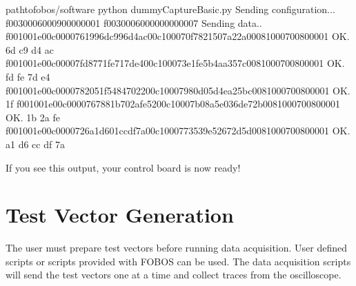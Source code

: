 \documentclass[letterpaper,10pt,english]{sphinxmanual}
\begin{document}
\begin{sphinxVerbatim}[commandchars=\\\{\}]
\PYGZdl{}  path\PYGZhy{}to\PYGZhy{}fobos/software
\PYGZdl{} python dummyCaptureBasic.py
Sending configuration...
f0030006000900000001
 
f0030006000000000007
 
Sending data..
f001001e00c0000761996dc996d4ac00c100070f7821507a22a00081000700800001
OK.     
  6d c9  d4 ac
f001001e00c00007fd8771fe717de400c100073e1fe5b4aa357c0081000700800001
OK.     
fd   fe  7d e4
f001001e00c0000782051f5484702200c10007980d05d4ea25bc0081000700800001
OK.     
  1f    
f001001e00c0000767881b702afe5200c10007b08a5e036de72b0081000700800001
OK.     
  1b  2a fe 
f001001e00c0000726a1d601ccdf7a00c1000773539e52672d5d0081000700800001
OK.     
 a1 d6  cc df 7a
\end{sphinxVerbatim}

If you see this output, your control board is now ready!


\chapter{Test Vector Generation}
\label{\detokenize{tvgen:test-vector-generation}}\label{\detokenize{tvgen:tvgen-label}}\label{\detokenize{tvgen::doc}}
The user must prepare test vectors before running data acquisition. User defined scripts or scripts provided with FOBOS can be used.
The data acquisition scripts will send the test vectors one at a time and collect traces from the oscilloscope.
\end{document}
